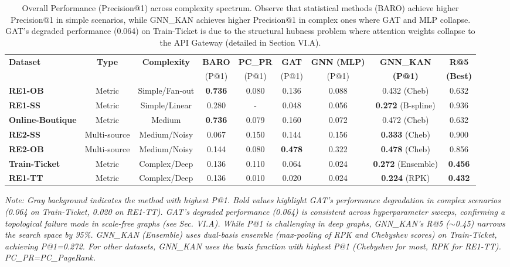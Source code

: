 \documentclass[conference]{IEEEtran}
\begin{document}
\begin{table}[htbp]
\centering
\caption{Overall Performance (Precision@1) across complexity spectrum. Observe that statistical methods (BARO) achieve higher Precision@1 in simple scenarios, while GNN\_KAN achieves higher Precision@1 in complex ones where GAT and MLP collapse. GAT's degraded performance (0.064) on Train-Ticket is due to the structural hubness problem where attention weights collapse to the API Gateway (detailed in Section VI.A).}
\label{tab:overall_results}
\footnotesize
\renewcommand{\arraystretch}{0.9}
\setlength{\tabcolsep}{3pt}
\begin{tabular}{l|c|c|cc|ccc|c}
\toprule
\textbf{Dataset} & \textbf{Type} & \textbf{Complexity} & \textbf{BARO} & \textbf{PC\_PR} & \textbf{GAT} & \textbf{GNN (MLP)} & \textbf{GNN\_KAN} & \textbf{R@5} \\
& & & (P@1) & (P@1) & (P@1) & (P@1) & \textbf{(P@1)} & \textbf{(Best)} \\
\midrule
\textbf{RE1-OB} & Metric & Simple/Fan-out & \cellcolor{gray!20}\textbf{0.736} & 0.080 & 0.136 & 0.088 & 0.432 (Cheb) & 0.632 \\
\textbf{RE1-SS} & Metric & Simple/Linear & 0.280 & - & 0.048 & 0.056 & \cellcolor{gray!20}\textbf{0.272} (B-spline) & 0.936 \\
\textbf{Online-Boutique} & Metric & Medium & \cellcolor{gray!20}\textbf{0.736} & 0.079 & 0.160 & 0.072 & 0.472 (Cheb) & 0.632 \\
\midrule
\textbf{RE2-SS} & Multi-source & Medium/Noisy & 0.067 & 0.150 & 0.144 & 0.156 & \cellcolor{gray!20}\textbf{0.333} (Cheb) & 0.900 \\
\textbf{RE2-OB} & Multi-source & Medium/Noisy & 0.144 & 0.080 & \cellcolor{gray!20}\textbf{0.478} & 0.322 & \cellcolor{gray!20}\textbf{0.478} (Cheb) & 0.856 \\
\midrule
\textbf{Train-Ticket} & Metric & Complex/Deep & 0.136 & 0.110 & 0.064 & 0.024 & \cellcolor{gray!20}\textbf{0.272} (Ensemble) & \cellcolor{gray!20}\textbf{0.456} \\
\textbf{RE1-TT} & Metric & Complex/Deep & 0.136 & 0.010 & 0.020 & 0.024 & \cellcolor{gray!20}\textbf{0.224} (RPK) & \cellcolor{gray!20}\textbf{0.432} \\
\bottomrule
\end{tabular}
\vspace{0.2cm}

\footnotesize \textit{Note: Gray background indicates the method with highest P@1. Bold values highlight GAT's performance degradation in complex scenarios (0.064 on Train-Ticket, 0.020 on RE1-TT). GAT's degraded performance (0.064) is consistent across hyperparameter sweeps, confirming a topological failure mode in scale-free graphs (see Sec. VI.A). While P@1 is challenging in deep graphs, GNN\_KAN's R@5 ($\sim$0.45) narrows the search space by 95\%. GNN\_KAN (Ensemble) uses dual-basis ensemble (max-pooling of RPK and Chebyshev scores) on Train-Ticket, achieving P@1=0.272. For other datasets, GNN\_KAN uses the basis function with highest P@1 (Chebyshev for most, RPK for RE1-TT). PC\_PR=PC\_PageRank.}
\end{table}
\end{document}

